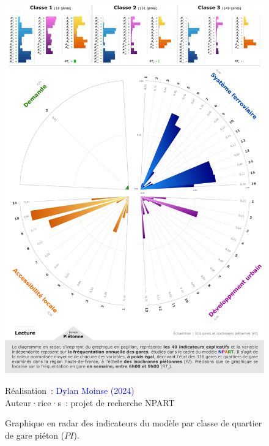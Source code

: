 \begin{refsegment}
    \begin{figure}[h!]\vspace*{4pt}
        \caption{Graphique en radar des indicateurs du modèle par classe de quartier de gare piéton (\(PI\)).}
        \label{fig-chap6:radar-pi}
        \centerline{\includegraphics[width=1\columnwidth]{src/Figures/Chap-6/FR_NPART_Radar_PI.pdf}}
        \vspace{5pt}
        \begin{flushright}\scriptsize{
        Réalisation~: \textcolor{blue}{Dylan Moinse (2024)}
        \\
        Auteur·rice·s~: projet de recherche \acrshort{NPART}
        }\end{flushright}
    \end{figure}


\end{refsegment}
